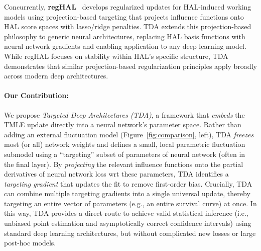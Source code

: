 \documentclass{article}
\theoremstyle{remark}
\begin{document}
Concurrently, \textbf{regHAL}~\cite{li2025regularized} develops regularized 
updates for HAL-induced working models using projection-based targeting 
that projects influence functions onto HAL score spaces with lasso/ridge 
penalties. TDA extends this projection-based philosophy to generic neural 
architectures, replacing HAL basis functions with neural network gradients 
and enabling application to any deep learning model. While regHAL focuses 
on stability within HAL's specific structure, TDA demonstrates that similar 
projection-based regularization principles apply broadly across modern 
deep architectures.

\paragraph{Our Contribution:}
We propose \emph{Targeted Deep Architectures (TDA)}, a framework that \emph{embeds} the TMLE update directly into a neural network’s parameter space.  Rather than adding an external fluctuation model (Figure~\ref{fig:comparison}, left), TDA \emph{freezes} most (or all) network weights and defines a small, local parametric fluctuation submodel using a “targeting” subset of parameters of neural network (often in the final layer).  By \emph{projecting} the relevant influence functions onto the partial derivatives of neural network loss wrt these parameters, TDA identifies a \emph{targeting gradient} that updates the fit to remove first-order bias.  Crucially, TDA can combine multiple targeting gradients into a single universal update, thereby targeting an entire vector of parameters (e.g., an entire survival curve) at once.  In this way, TDA provides a direct route to achieve valid statistical inference (i.e., unbiased point estimation and asymptotically correct confidence intervals) using standard deep learning architectures, but without complicated new losses or large post-hoc models.
\end{document}
